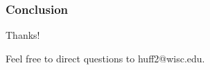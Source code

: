 
\begin{frame}[ctb!]
  \frametitle{Conclusion}
  Thanks!
  
  Feel free to direct questions to huff2@wisc.edu.
\end{frame}
